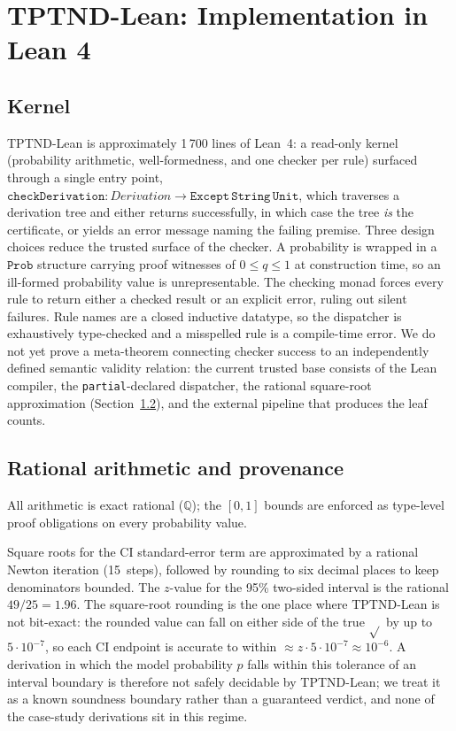 \documentclass{ceurart}
\begin{document}
\section{TPTND-Lean: Implementation in Lean 4}\label{sec:impl}

\subsection{Kernel}\label{sec:arch}

TPTND-Lean is approximately 1\,700 lines of Lean~4: a read-only kernel
(probability arithmetic, well-formedness, and one checker per
rule) surfaced through a single entry point,
$\texttt{checkDerivation}: \mathit{Derivation} \to
\mathtt{Except\,String\,Unit}$, which traverses a derivation tree
and either returns successfully, in which case the tree
\emph{is} the certificate, or yields an error message naming the
failing premise.
Three design choices reduce the trusted surface of the checker.
A probability is wrapped in a $\mathtt{Prob}$ structure carrying
proof witnesses of $0\le q\le 1$ at construction time, so an
ill-formed probability value is unrepresentable.  The checking
monad forces every rule to return either a checked result or an
explicit error, ruling out silent failures.  Rule names are a
closed inductive datatype, so the dispatcher is exhaustively
type-checked and a misspelled rule is a compile-time error.
We do not yet prove a meta-theorem connecting checker success to
an independently defined semantic validity relation: the current
trusted base consists of the Lean compiler, the
\texttt{partial}-declared dispatcher, the rational
square-root approximation (Section~\ref{sec:arith}), and the
external pipeline that produces the leaf counts.

\subsection{Rational arithmetic and provenance}\label{sec:arith}

All arithmetic is exact rational ($\mathbb{Q}$); the $[0,1]$
bounds are enforced as type-level proof obligations on every
probability value.

Square roots for the CI standard-error term are approximated by
a rational Newton iteration (15~steps), followed by rounding to
six decimal places to keep denominators bounded.
The $z$-value for the 95\% two-sided interval is the rational
$49/25 = 1.96$.
%
The square-root rounding is the one place where TPTND-Lean is not bit-exact:
the rounded value can fall on either side of the true $\sqrt{}$ by up to
$5\cdot10^{-7}$, so each CI endpoint is accurate to within
$\approx z \cdot 5\cdot10^{-7} \approx 10^{-6}$.
A derivation in which the model probability $p$ falls within
this tolerance of an interval boundary is therefore not safely
decidable by TPTND-Lean; we treat it as a known soundness boundary
rather than a guaranteed verdict, and none of the case-study
derivations sit in this regime.
\end{document}
